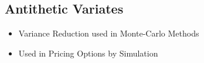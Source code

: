 
\subsection{Antithetic Variates}

\begin{itemize}
\item Variance Reduction used in Monte-Carlo Methods
\item Used in Pricing Options by Simulation

\end{itemize}


